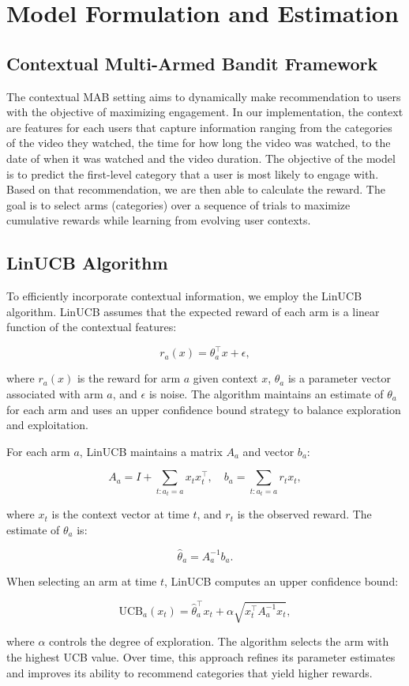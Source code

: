 \section{Model Formulation and Estimation}

\subsection{Contextual Multi-Armed Bandit Framework}

The contextual MAB setting aims to dynamically make recommendation to users with the objective of maximizing engagement. In our implementation, the context are features for each users that capture information ranging from the categories of the video they watched, the time for how long the video was watched, to the date of when it was watched and the video duration. The objective of the model is to predict the first-level category that a user is most likely to engage with. Based on that recommendation, we are then able to calculate the reward. The goal is to select arms (categories) over a sequence of trials to maximize cumulative rewards while learning from evolving user contexts.

\subsection{LinUCB Algorithm}

To efficiently incorporate contextual information, we employ the LinUCB algorithm. LinUCB assumes that the expected reward of each arm is a linear function of the contextual features:

\[
r_{a}(x) = \theta_a^\top x + \epsilon,
\]

where \(r_{a}(x)\) is the reward for arm \(a\) given context \(x\), \(\theta_a\) is a parameter vector associated with arm \(a\), and \(\epsilon\) is noise. The algorithm maintains an estimate of \(\theta_a\) for each arm and uses an upper confidence bound strategy to balance exploration and exploitation.

For each arm \(a\), LinUCB maintains a matrix \(A_a\) and vector \(b_a\):

\[
A_a = I + \sum_{t: a_t = a} x_t x_t^\top, \quad b_a = \sum_{t: a_t = a} r_{t} x_t,
\]

where \(x_t\) is the context vector at time \(t\), and \(r_t\) is the observed reward. The estimate of \(\theta_a\) is:

\[
\hat{\theta}_a = A_a^{-1} b_a.
\]

When selecting an arm at time \(t\), LinUCB computes an upper confidence bound:

\[
\text{UCB}_a(x_t) = \hat{\theta}_a^\top x_t + \alpha \sqrt{x_t^\top A_a^{-1} x_t},
\]

where \(\alpha\) controls the degree of exploration. The algorithm selects the arm with the highest UCB value. Over time, this approach refines its parameter estimates and improves its ability to recommend categories that yield higher rewards.